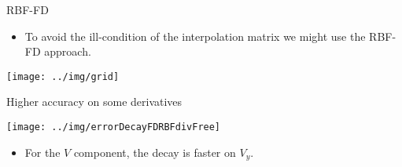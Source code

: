 \documentclass{beamer}
\begin{document}
\begin{frame}{RBF-FD}
  \begin{itemize}
    \item To avoid the ill-condition of the interpolation matrix we might use
      the RBF-FD approach.
  \end{itemize}
  \begin{center}
    \texttt{[image: ../img/grid]}
  \end{center}
\end{frame}

\begin{frame}{Higher accuracy on some derivatives}
  \begin{center}
   \texttt{[image: ../img/errorDecayFDRBFdivFree]}
  \end{center}
  
  \begin{itemize}
    \item For the $V$ component, the decay is faster on $V_y$.
  \end{itemize}
\end{frame}
\end{document}
